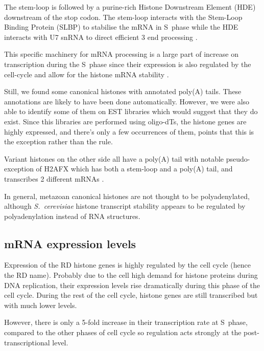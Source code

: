 \documentclass[10pt,a4paper,twocolumn,article]{memoir}
\newcommand{\addref}[1][]{\todo[color=red!40,size=\tiny]{Add reference: #1}}
\begin{document}

      The stem-loop is followed by a purine-rich Histone Downstream Element (HDE)
      downstream of the stop codon. The stem-loop interacts with the Stem-Loop
      Binding Protein (SLBP) to stabilise the mRNA in S~phase \citep{SLBP-regulation}
      while the HDE interacts with U7 snRNA to direct efficient 3 end processing
      \citep{HDE-sequence}.


      This specific machinery for mRNA processing is a large part of increase on
      transcription during the S~phase since their expression is also regulated
      by the cell-cycle \addref and allow for the histone mRNA stability \addref.

      Still, we found some canonical histones with annotated poly(A) tails. These annotations
      are likely to have been done automatically. However, we were also able to identify
      some of them on EST libraries which would suggest that they do exist. Since
      this libraries are performed using oligo-dTs, the histone genes are highly
      expressed, and there's only a few occurrences of them, points that this is
      the exception rather than the rule.

      Variant histones on the other side all have a poly(A) tail with notable
      pseudo-exception of H2AFX which has both a stem-loop and a poly(A) tail,
      and transcribes 2 different mRNAs \citep{HTwoAX-transcripts}.

      In general, metazoan canonical histones
      are not thought to be polyadenylated, although \textit{S.\ cerevisiae} histone transcript stability
      appears to be regulated by polyadenylation instead of RNA structures.

    \subsection{mRNA expression levels}
      Expression of the RD histone genes is highly regulated by the cell cycle (hence the RD name). Probably due
      to the cell high demand for histone proteins during DNA replication, their expression levels rise dramatically
      during this phase of the cell cycle. During the rest of the cell cycle, histone genes are still transcribed
      but with much lower levels.

      However, there is only a 5-fold increase in their transcription rate at S~phase, compared to the other phases
      of cell cycle so regulation acts strongly at the post-transcriptional level\addref.
\end{document}
